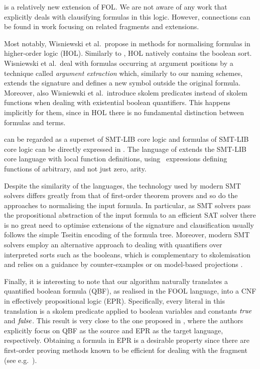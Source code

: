 \folb{} is a relatively new extension of FOL. We are not aware of any work that explicitly deals with clausifying formulas in this logic. However, connections can be found in work focusing on related fragments and extensions.

Most notably, Wisniewski et al.~propose in %
\cite{DBLP:conf/cade/WisniewskiSKB16}
methods for normalising formulas in higher-order logic (HOL). Similarly to \folb{},
HOL natively contains the boolean sort. Wisniewski et al.~deal with 
formulas occurring at argument positions by a technique called \emph{argument extraction} 
which, similarly to our naming schemes, extends the signature and defines a new symbol
outside the original formula. Moreover, also Wisniewski et al.~introduce skolem predicates 
instead of skolem functions when dealing with existential boolean quantifiers. 
This happens implicitly for them, since in HOL there is no fundamental distinction between formulas and terms.

\folb{} can be regarded as a superset of SMT-LIB \cite{BarFT-SMTLIB} core logic and formulas of SMT-LIB core logic can be directly expressed in \folb{}. The language of \folb{} extends the SMT-LIB core language with local function definitions, using \LETIN\ expressions defining functions of arbitrary, and not just zero, arity. 

Despite the similarity of the languages, the technology used by modern SMT solvers \cite{DBLP:journals/jacm/NieuwenhuisOT06}
differs greatly from that of %
first-order theorem provers and so do the approaches to normalising the input formula.
In particular, as SMT solvers pass the propositional abstraction of the input formula to an efficient SAT solver
there is no great need to optimise extensions of the signature 
and clausification usually follows the simple Tseitin encoding \cite{tseitin_enc} of the formula tree.
%
Moreover, modern SMT solvers employ an alternative approach to dealing with quantifiers over interpreted sorts such as the booleans, 
which is complementary to skolemisation
and relies on a guidance by counter-examples 
\cite{DBLP:journals/corr/Reynolds0K15} or on model-based projections \cite{LPAR-20:Playing_with_Quantified_Satisfaction}.

Finally, it is interesting to note that our \nfcnf{} algorithm naturally translates a quantified boolean formula (QBF),
as realised in the FOOL language, into a CNF in effectively propositional logic (EPR).
Specifically, every literal in this translation is 
a skolem predicate applied to boolean variables and constants $\mathit{true}$ and $\mathit{false}$.
This result is very close to the one proposed in \cite{DBLP:conf/cade/SeidlLB12},
where the authors explicitly focus on QBF as the source and EPR as the target language, respectively.
Obtaining a formula in EPR is a desirable property %
since there are first-order proving methods 
known to be efficient for dealing with the fragment (see e.g.~\cite{DBLP:conf/birthday/Korovin13}).